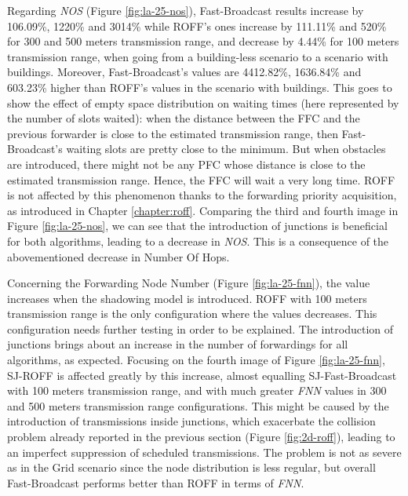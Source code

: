 		
		Regarding \textit{NOS} (Figure \ref{fig:la-25-nos}), Fast-Broadcast results increase by 106.09\%, 1220\% and 3014\% while ROFF's ones increase by 111.11\% and 520\% for 300 and 500 meters transmission range, and decrease by 4.44\% for 100 meters transmission range, when going from a building-less scenario to a scenario with buildings. Moreover, Fast-Broadcast's values are 4412.82\%, 1636.84\% and 603.23\% higher than ROFF's values in the scenario with buildings. This goes to show the effect of empty space distribution on waiting times (here represented by the number of slots waited): when the distance between the FFC and the previous forwarder is close to the estimated transmission range, then Fast-Broadcast's waiting slots are pretty close to the minimum. But when obstacles are introduced, there might not be any PFC whose distance is close to the estimated transmission range. Hence, the FFC will wait a very long time. ROFF is not affected by this phenomenon thanks to the forwarding priority acquisition, as introduced in Chapter \ref{chapter:roff}. Comparing the third and fourth image in Figure \ref{fig:la-25-nos}, we can see that the introduction of junctions is beneficial for both algorithms, leading to a decrease in \textit{NOS}. This is a consequence of the abovementioned decrease in Number Of Hops.
			
		Concerning the Forwarding Node Number (Figure \ref{fig:la-25-fnn}), the value increases when the shadowing model is introduced. ROFF with 100 meters transmission range is the only configuration where the values decreases. This configuration needs further testing in order to be explained.
		The introduction of junctions brings about an increase in the number of forwardings for all algorithms, as expected. Focusing on the fourth image of Figure \ref{fig:la-25-fnn}, SJ-ROFF is affected greatly by this increase, almost equalling SJ-Fast-Broadcast with 100 meters transmission range, and with much greater \textit{FNN} values in 300 and 500 meters transmission range configurations. This might be caused by the introduction of transmissions inside junctions, which exacerbate the collision problem already reported in the previous section (Figure \ref{fig:2d-roff}), leading to an imperfect suppression of scheduled transmissions. The problem is not as severe as in the Grid scenario since the node distribution is less regular, but overall Fast-Broadcast performs better than ROFF in terms of \textit{FNN}.
	
